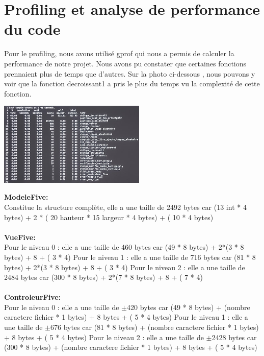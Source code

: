 \documentclass[a4paper, 11pt, oneside]{article}
\begin{document}
\section{Profiling et analyse de performance du code}
Pour le profiling, nous avons utilisé gprof qui nous a permis de calculer la performance de notre projet. Nous avons pu constater que certaines fonctions prennaient plus de temps que d'autres. 
Sur la photo ci-dessous , nous pouvons y voir que la fonction decroissant1 a pris le plus du temps vu la complexité de cette fonction.\\
\begin{center}
    \includegraphics[width=7cm]{./images/gprof.jpg}
\end{center}

\textbf{ModeleFive:}\\ 
Constitue la structure complète, elle a une taille de 2492 bytes car (13 int * 4 bytes) + 2 * ( 20 hauteur * 15 largeur * 4 bytes) + ( 10 * 4 bytes)
\\ \\

\textbf{VueFive:}\\
Pour le niveau 0 : elle a une taille de 460 bytes car (49 * 8 bytes) + 2*(3 * 8 bytes) + 8 + ( 3 * 4)
\newline
Pour le niveau 1 : elle a une taille de 716 bytes car (81 * 8 bytes) + 2*(3 * 8 bytes) + 8 + ( 3 * 4)
\newline
Pour le niveau 2 : elle a une taille de 2484 bytes car (300 * 8 bytes) + 2*(7 * 8 bytes) + 8 + ( 7 * 4)
\\ \\
\textbf{ControleurFive:}\\
Pour le niveau 0 : elle a une taille de $\pm$420 bytes car (49 * 8 bytes) + (nombre caractere fichier * 1 bytes) + 8 bytes + ( 5 * 4 bytes)
\newline
Pour le niveau 1 : elle a une taille de $\pm$676 bytes car (81 * 8 bytes) + (nombre caractere fichier * 1 bytes) + 8 bytes + ( 5 * 4 bytes)
\newline
Pour le niveau 2 : elle a une taille de $\pm$2428 bytes car (300 * 8 bytes) + (nombre caractere fichier * 1 bytes) + 8 bytes + ( 5 * 4 bytes)
\end{document}
